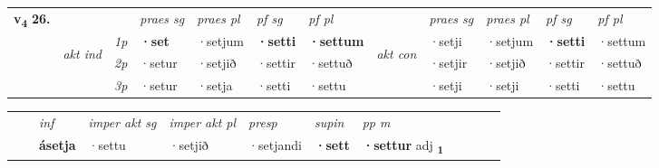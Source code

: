 \begin{tabular}{llllllllllll} \toprule
\multirow{4}{*}{{{\textbf{v{\textsubscript{4}}} \Large{\textbf{26.}}}}}  & &   &  \textit{praes sg}  & \textit{praes pl}  &\textit{ pf sg} & \textit{pf pl} &  &  \textit{praes sg}  & \textit{praes pl}  & \textit{pf sg} & \textit{pf pl } \\*
	\cmidrule{4-7} \cmidrule{9-12}
 & \multirow{3}{*}{\begin{turn}{90}\textit{akt ind}\end{turn}} & {\textit{1p}} & \textbf{·set} & ·setjum    & \textbf{·setti} & \textbf{·settum} & \multirow{3}{*}{\begin{turn}{90}\textit{akt con}\end{turn}} &·setji & ·setjum & \textbf{·setti} & ·settum\\*
& &  {\textit{2p}} &  ·setur  & ·setjið   & ·settir & ·settuð & & ·setjir & ·setjið & ·settir & ·settuð \\*
& &  {\textit{3p}} & ·setur & ·setja   & ·setti & ·settu & & ·setji & ·setji& ·setti & ·settu  \\*
\cmidrule{4-7} \cmidrule{9-12}
\end{tabular}


\begin{tabular}{llllllllllll}
 & & \textit{inf} & \textit{imper akt sg} & \textit{imper akt pl}   & \textit{presp} & \textit{supin}  & \textit{pp m}     \\*
  & & \textbf{ásetja} & ·settu  & ·setjið   & ·setjandi &  \textbf{·sett}  & \textbf{·settur} adj \textbf{\textsubscript{1}} \\*
\cmidrule{1-12}
\end{tabular}



